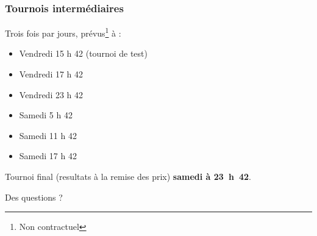 \documentclass[table]{beamer}
\begin{document}
\begin{frame}
    \frametitle{Tournois intermédiaires}
    Trois fois par jours, prévus\footnote{Non contractuel} à :
    \begin{itemize}
        \item Vendredi 15 h 42 (tournoi de test)
        \item Vendredi 17 h 42
        \item Vendredi 23 h 42
        \item Samedi 5 h 42
        \item Samedi 11 h 42
        \item Samedi 17 h 42
    \end{itemize}
    Tournoi final (resultats à la remise des prix) \textbf{samedi à 23~h~42}.
\end{frame}


\begin{frame}
    \begin{center}
        \huge{Des questions ?}
    \end{center}
\end{frame}
\end{document}
